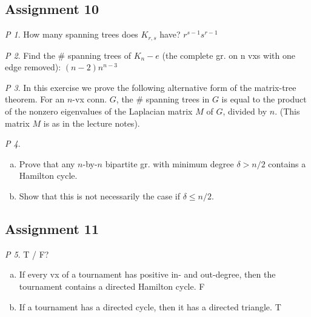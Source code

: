 \documentclass[11pt, fleqn, a4paper, landscape]{article}
\theoremstyle{plain} %
\theoremstyle{remark} %
\newtheorem{problem}{P}
\theoremstyle{definition} %
\begin{document}
\begin{multicols}{5}
\subsection{Assignment 10}

\begin{problem}
How many spanning trees does $K_{r,s}$ have? $r^{s-1}s^{r-1}$
\end{problem}

\begin{problem}
Find the \# spanning trees of $K_n- e$ (the complete gr. on n vxs with one edge removed): $(n-2)n^{n-3}$
\end{problem}

\begin{problem}
In this exercise we prove the following alternative form of the matrix-tree theorem. For an $n$-vx conn. $G$, the \# spanning trees in $G$ is equal to the product of the  nonzero eigenvalues of the Laplacian matrix $M$ of $G$, divided by $n$. (This matrix $M$ is as in the lecture notes).
\end{problem}

\begin{problem}
\begin{enumerate}[(a)]
\item Prove that any $n$-by-$n$ bipartite gr. with minimum degree $\delta > n/2$ contains a Hamilton cycle.
\item  Show that this is not necessarily the case if $\delta\le n/2$.
\end{enumerate}
\end{problem}

\subsection{Assignment 11}

\begin{problem}
T / F?
\begin{enumerate}[(a)]
\item If every vx of a tournament has positive in- and out-degree, then the tournament contains a directed Hamilton cycle. F
\item If a tournament has a directed cycle, then it has a directed triangle. T
\end{enumerate} 
\end{problem}


\end{multicols}
\end{document}
